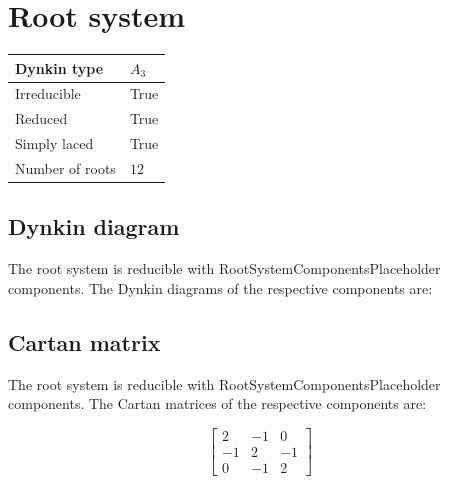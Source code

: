 \documentclass[11pt]{article}
\theoremstyle{definition}
\newif\ifrootsystemirreducible
\begin{document}
\newpage
\section{Root system}

\begin{tabular}{|l|l|}
	\hline
    Dynkin type & $A_3$ \\
	\hline
    Irreducible & True \\
	\hline
    Reduced & True \\
	\hline
	Simply laced & True \\
	\hline
	Number of roots & $12$ \\
	\hline
\end{tabular}

\subsection{Dynkin diagram}

\ifrootsystemirreducible
The root system is irreducible and has Dynkin diagram:
\else
The root system is reducible with RootSystemComponentsPlaceholder components. The Dynkin diagrams of the respective components are:
\fi


\subsection{Cartan matrix}

\ifrootsystemirreducible
The root system is irreducible and has Cartan matrix:
\else
The root system is reducible with RootSystemComponentsPlaceholder components. The Cartan matrices of the respective components are:
\fi

\[
\left[\begin{matrix}2 & -1 & 0\\-1 & 2 & -1\\0 & -1 & 2\end{matrix}\right]
\]
\end{document}

